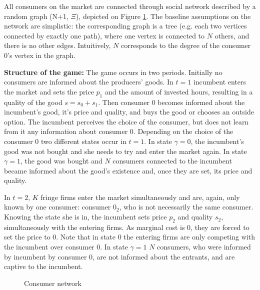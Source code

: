 \documentclass{article}
\numberwithin{figure}{section}
\numberwithin{table}{section}
\theoremstyle{indented}
\numberwithin{equation}{section} %
\begin{document}

All consumers on the market are connected through social network described by a random graph (N+1, $\Xi$), depicted on Figure \ref{network}. The baseline assumptions on the network are simplistic: the corresponding graph is a tree (e.g. each two vertices connected by exactly one path), where one vertex is connected to $N$ others, and there is no other edges. Intuitively, $N$ corresponds to the degree of the consumer 0's vertex in the graph. 

\textbf{Structure of the game:}
The game occurs in two periods. Initially no consumers are informed about the producers' goods. In \textbf{$t=1$} incumbent enters the market and sets the price $p_1$ and the amount of invested hours, resulting in a quality of the good $s = s_0+s_1$. Then consumer 0 becomes informed about the incumbent's good, it's price and quality, and buys the good or chooses an outside option. The incumbent perceives the choice of the consumer, but does not learn from it any information about consumer 0. Depending on the choice of the consumer 0 two different states occur in $t=1$. In state $\gamma=0$, the incumbent's good was not bought and she needs to try and enter the market again. In state $\gamma=1$, the good was bought and $N$ consumers connected to the incumbent became informed about the good's existence and, once they are set, its price and quality. 

In \textbf{$t=2$}, $K$ fringe firms enter the market simultaneously and are, again, only known by one consumer: consumer $0_2$, who is not necessarily the same consumer. Knowing the state she is in, the incumbent sets price $p_2$ and quality $s_2$, simultaneously with the entering firms. As marginal cost is 0, they are forced to set the price to 0. Note that in state 0 the entering firms are only competing with the incumbent over consumer 0. In state $\gamma=1$ $N$ consumers, who were informed by incumbent by consumer 0, are not informed about the entrants, and are captive to the incumbent.






\begin{figure}
\centering
{}
\caption{Consumer network}
\label{network}
\end{figure}
\end{document}
